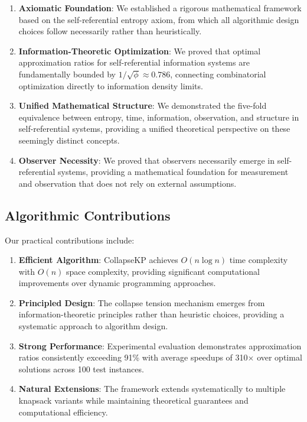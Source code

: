\documentclass[11pt]{article}
\theoremstyle{remark}
\theoremstyle{definition}
\begin{document}
\begin{enumerate}
\item \textbf{Axiomatic Foundation}: We established a rigorous mathematical framework based on the self-referential entropy axiom, from which all algorithmic design choices follow necessarily rather than heuristically.

\item \textbf{Information-Theoretic Optimization}: We proved that optimal approximation ratios for self-referential information systems are fundamentally bounded by $1/\sqrt{\phi} \approx 0.786$, connecting combinatorial optimization directly to information density limits.

\item \textbf{Unified Mathematical Structure}: We demonstrated the five-fold equivalence between entropy, time, information, observation, and structure in self-referential systems, providing a unified theoretical perspective on these seemingly distinct concepts.

\item \textbf{Observer Necessity}: We proved that observers necessarily emerge in self-referential systems, providing a mathematical foundation for measurement and observation that does not rely on external assumptions.
\end{enumerate}

\subsection{Algorithmic Contributions}

Our practical contributions include:

\begin{enumerate}
\item \textbf{Efficient Algorithm}: CollapseKP achieves $O(n \log n)$ time complexity with $O(n)$ space complexity, providing significant computational improvements over dynamic programming approaches.

\item \textbf{Principled Design}: The collapse tension mechanism emerges from information-theoretic principles rather than heuristic choices, providing a systematic approach to algorithm design.

\item \textbf{Strong Performance}: Experimental evaluation demonstrates approximation ratios consistently exceeding 91\% with average speedups of 310$\times$ over optimal solutions across 100 test instances.

\item \textbf{Natural Extensions}: The framework extends systematically to multiple knapsack variants while maintaining theoretical guarantees and computational efficiency.
\end{enumerate}
\end{document}

